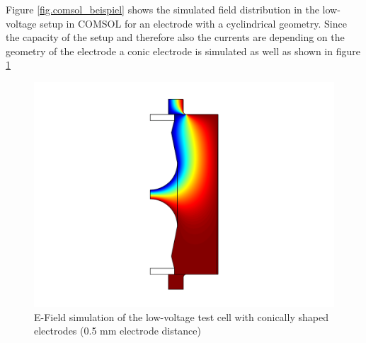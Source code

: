Figure \ref{fig.comsol_beispiel} shows the simulated field distribution in the low-voltage setup in COMSOL for an electrode with a cyclindrical geometry. Since the capacity of the setup and therefore also the currents are depending on the geometry of the electrode a conic electrode is simulated as well as shown in figure  \ref{fig.comsol_conic}

\begin{figure}[htbp]
	\centering
	\includegraphics[scale=0.3]{figures/Method/Part1_d_C0/conic.png}		
	\caption[Kurze Abbildungsbeschreibung]{E-Field simulation of the low-voltage test cell with conically shaped electrodes (0.5 mm electrode distance)} \label{fig.comsol_conic}

\end{figure}

